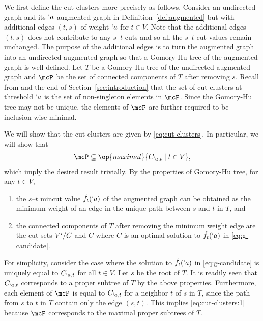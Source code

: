 \begin{Proof}
  We first define the cut-clusters more precisely as follows.
  Consider an undirected graph and its $`a$-augmented graph in Definition~\ref{def:augmented} but with additional edges $(t,s)$ of weight $`a$ for $t\in V$. Note that the additional edges $(t,s)$ does not contribute to any $s$--$t$ cuts and so all the $s$--$t$ cut values remain unchanged. The purpose of the additional edges is to turn the augmented graph into an undirected augmented graph so that a Gomory-Hu tree of the augmented graph is well-defined. 
  Let $T$ be a Gomory-Hu tree of the undirected augmented graph and $\mcP$ be the set of connected components of $T$ after removing $s$. 
  Recall from \cite{flake:cut-clustering} and the end of Section~\ref{sec:introduction} that the set of cut clusters at threshold $`a$ is the set of non-singleton elements in $\mcP$. Since the Gomory-Hu tree may not be unique, the elements of $\mcP$ are further required to be inclusion-wise minimal. 
  
  We will show that the cut clusters are given by \eqref{eq:cut-clusters}. In particular, we will show that
  \begin{align}
      \mcP\subseteq \op{maximal}\Set{C_{`a,t}\mid t\in V}, \label{eq:cut-clusters:1}
  \end{align}
  which imply the desired result trivially. By the properties of Gomory-Hu tree, for any $t\in V$,
  \begin{enumerate}
      \item\label{prop:cc:1} the $s$--$t$ mincut value $\hat{f}_t(`a)$ of the augmented graph can be obtained as the minimum weight of an edge in the unique path between $s$ and $t$ in $T$, and
      \item\label{prop:cc:2} the connected components of $T$ after removing the minimum weight edge are the cut sets $V`/C$ and $C$ where $C$ is an optimal solution to $\hat{f}_t(`a)$ in \eqref{eq:g-candidate}.
  \end{enumerate}
  For simplicity, consider the case where the solution to $\hat{f}_t(`a)$ in \eqref{eq:g-candidate} is uniquely equal to $C_{`a,t}$ for all $t\in V$. 
  Let $s$ be the root of $T$. It is readily seen that $C_{`a,t}$ corresponds to a proper subtree of $T$ by the above properties. Furthermore, each element of $\mcP$ is equal to $C_{`a,t}$ for a neighbor $t$ of $s$ in $T$, since the path from $s$ to $t$ in $T$ contain only the edge $(s,t)$. This implies \eqref{eq:cut-clusters:1} because $\mcP$ corresponds to the maximal proper subtrees of $T$.
  

\end{Proof}
